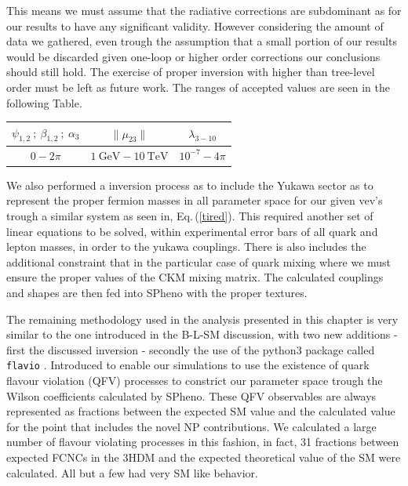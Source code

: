 %
This means we must assume that the radiative corrections are subdominant as for our results to have any significant validity.
%
However considering the amount of data we gathered, even trough the assumption that a small portion of our results would be discarded given one-loop or higher order corrections our conclusions should still hold.
% 
The exercise of proper inversion with higher than tree-level order must be left as future work.
% 
The ranges of accepted values are seen in the following Table.
%
\begin{table}[H]
\centering
\begin{tabular}{ccc}
$\psi_{1,2} \ ; \ \beta_{1,2} \ ;\  \alpha_3 $ & $\|\mu_{23}\|$ & $\lambda_{3-10}$ \\ \hline
$0- 2\pi$    & $1 \ \text{GeV} - 10 \ \text{TeV}$ & $10^{-7} - 4\pi$    
\end{tabular}
\end{table}

We also performed a inversion process as to include the Yukawa sector as to represent the proper fermion masses in all parameter space for our given vev's trough a similar system as seen in, Eq.\,(\ref{tired}). 
% 
This required another set of linear equations to be solved, within experimental error bars of all quark and lepton masses, in order to the yukawa couplings.
% 
There is also includes the additional constraint that in the particular case of quark mixing where we must ensure the proper values of the CKM mixing matrix.  
%
The calculated couplings and shapes are then fed into SPheno with the proper textures. 


%
The remaining methodology used in the analysis presented in this chapter is very similar to the one introduced in the B-L-SM discussion, with two new additions - first the discussed inversion - secondly the use of the python3 package called \texttt{flavio}  \cite{straub2018flavio}. 
%
Introduced to enable our simulations to use the existence of quark flavour violation (QFV) processes to constrict our parameter space trough the Wilson coefficients calculated by SPheno. 
%
These QFV observables are always represented as fractions between the expected SM value and the calculated value for the point that includes the novel NP contributions. 
%
We calculated a large number of flavour violating processes in this fashion, in fact, 31 fractions between expected FCNCs in the 3HDM and the expected theoretical value of the SM were calculated. All but a few had very SM like behavior. 

